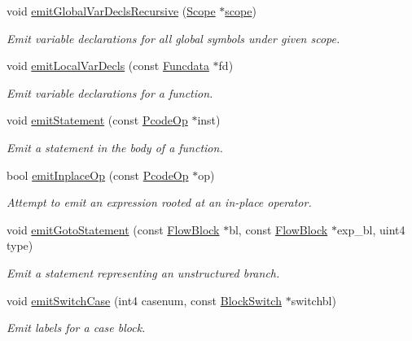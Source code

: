 \begin{DoxyCompactItemize}
void \mbox{\hyperlink{class_print_c_a7d048e59d4632ce57b87398378a6538c}{emit\+Global\+Var\+Decls\+Recursive}} (\mbox{\hyperlink{class_scope}{Scope}} $\ast$\mbox{\hyperlink{class_print_c_ad83977328e9bfa4f33276563a4306d3e}{scope}})
\begin{DoxyCompactList}\small\item\em Emit variable declarations for all global symbols under given scope. \end{DoxyCompactList}\item 
void \mbox{\hyperlink{class_print_c_a344e10d6f5f8b2b2fda6dc627e1b3c94}{emit\+Local\+Var\+Decls}} (const \mbox{\hyperlink{class_funcdata}{Funcdata}} $\ast$fd)
\begin{DoxyCompactList}\small\item\em Emit variable declarations for a function. \end{DoxyCompactList}\item 
void \mbox{\hyperlink{class_print_c_a790cee3e0a91933b641ccf0433868ef1}{emit\+Statement}} (const \mbox{\hyperlink{class_pcode_op}{Pcode\+Op}} $\ast$inst)
\begin{DoxyCompactList}\small\item\em Emit a statement in the body of a function. \end{DoxyCompactList}\item 
bool \mbox{\hyperlink{class_print_c_aa1189e40787980076c6827bb4e20fbef}{emit\+Inplace\+Op}} (const \mbox{\hyperlink{class_pcode_op}{Pcode\+Op}} $\ast$op)
\begin{DoxyCompactList}\small\item\em Attempt to emit an expression rooted at an {\itshape in-\/place} operator. \end{DoxyCompactList}\item 
void \mbox{\hyperlink{class_print_c_afd7a9bbef5548e06712bd84e130b89f8}{emit\+Goto\+Statement}} (const \mbox{\hyperlink{class_flow_block}{Flow\+Block}} $\ast$bl, const \mbox{\hyperlink{class_flow_block}{Flow\+Block}} $\ast$exp\+\_\+bl, uint4 type)
\begin{DoxyCompactList}\small\item\em Emit a statement representing an unstructured branch. \end{DoxyCompactList}\item 
void \mbox{\hyperlink{class_print_c_afe955f74fd15f96204c3060ea22ea080}{emit\+Switch\+Case}} (int4 casenum, const \mbox{\hyperlink{class_block_switch}{Block\+Switch}} $\ast$switchbl)
\begin{DoxyCompactList}\small\item\em Emit labels for a {\itshape case} block. \end{DoxyCompactList}\item 

\end{DoxyCompactItemize}
